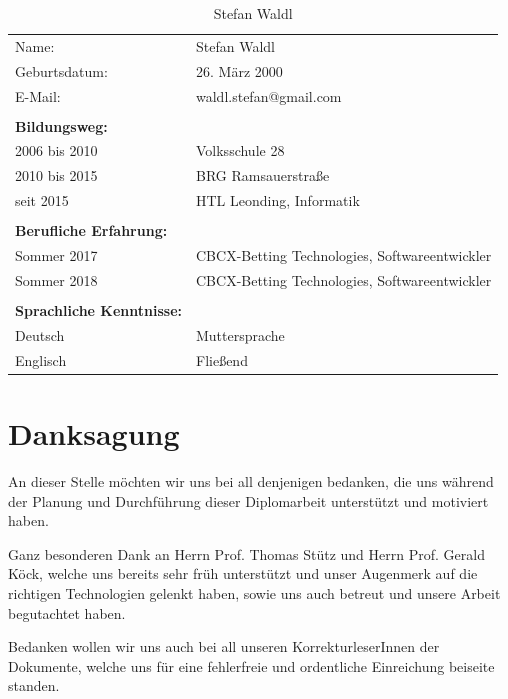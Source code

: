 \begin{table}[htb]
\begin{tabular}{ll}
Name:                            & Stefan Waldl          		 \\
Geburtsdatum:                    & 26. März 2000                 \\
E-Mail:                          & waldl.stefan@gmail.com        \\
                                 &                               \\
\textbf{Bildungsweg:}            &                               \\  
2006 bis 2010                    & Volksschule 28      		     \\
2010 bis 2015                    & BRG Ramsauerstraße    	 	 \\
seit 2015                        & HTL Leonding, Informatik      \\
                                 &                               \\
\textbf{Berufliche Erfahrung:}   &                               \\
Sommer 2017                      & CBCX-Betting Technologies, Softwareentwickler \\
Sommer 2018                      & CBCX-Betting Technologies, Softwareentwickler \\
                                 &                               \\
\textbf{Sprachliche Kenntnisse:} &                               \\
Deutsch                          & Muttersprache                 \\
Englisch                         & Fließend                     
\end{tabular}
\caption{Stefan Waldl}
\end{table}
\pagebreak
 

\section*{Danksagung}

An dieser Stelle möchten wir uns bei all denjenigen bedanken, die uns während der
Planung und Durchführung dieser Diplomarbeit unterstützt und motiviert haben.

Ganz besonderen Dank an Herrn Prof. Thomas Stütz und Herrn Prof. Gerald Köck, welche uns bereits sehr früh unterstützt und unser Augenmerk auf die richtigen Technologien gelenkt haben, sowie uns auch betreut und unsere Arbeit begutachtet haben.

Bedanken wollen wir uns auch bei all unseren KorrekturleserInnen der Dokumente, welche
uns für eine fehlerfreie und ordentliche Einreichung beiseite standen.